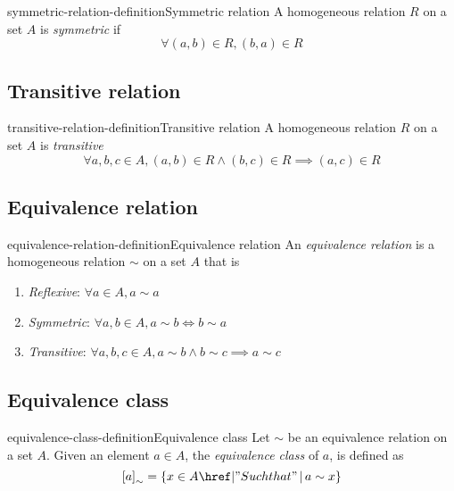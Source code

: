 \documentclass[preview]{standalone}
\begin{document}
\begin{snippetdefinition}{symmetric-relation-definition}{Symmetric relation}
    A homogeneous relation \(R\) on a set \(A\) is \textit{symmetric}
    if
    \[
        \forall (a,b) \in R, (b,a) \in R
    \]
\end{snippetdefinition}

\subsection{Transitive relation}

\begin{snippetdefinition}{transitive-relation-definition}{Transitive relation}
    A homogeneous relation \(R\) on a set \(A\) is \textit{transitive}
    \[
        \forall a,b,c \in A, (a,b) \in R \land (b,c) \in R \implies (a,c) \in R 
    \]
\end{snippetdefinition}

\subsection{Equivalence relation}

\begin{snippetdefinition}{equivalence-relation-definition}{Equivalence relation}
    An \textit{equivalence relation} is a homogeneous relation \(\sim\) on a set \(A\)
    that is
    \begin{enumerate}
        \item \textit{Reflexive}: \(\forall a \in A, a \sim a\)
        \item \textit{Symmetric}: \(\forall a,b \in A, a \sim b \iff b \sim a\)
        \item \textit{Transitive}: \(\forall a,b,c \in A, a \sim b \land b \sim c \implies a \sim c\)
    \end{enumerate}
\end{snippetdefinition}

\subsection{Equivalence class}

\begin{snippetdefinition}{equivalence-class-definition}{Equivalence class}
    Let \(\sim\) be an equivalence relation on a set \(A\).
    Given an element \(a\in A\), the \textit{equivalence class} of \(a\), is defined as
    \[
        {[a]}_{\sim} = \{x \in A \suchthat a \sim x\}
    \]
\end{snippetdefinition}
\end{document}
